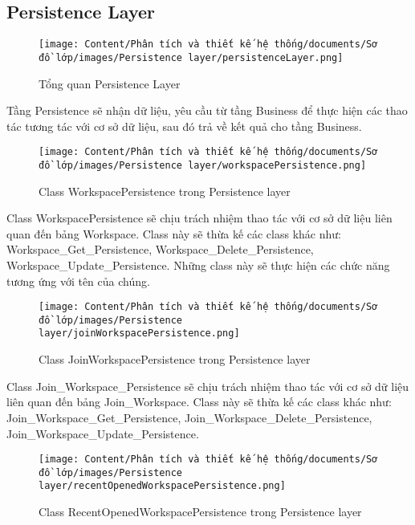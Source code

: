 \subsection{Persistence Layer}

\begin{figure}[H]
    \centering
    \texttt{[image: Content/Phân tích và thiết kế hệ thống/documents/Sơ đồ lớp/images/Persistence layer/persistenceLayer.png]}
    \vspace{0.5cm}
    \caption{Tổng quan Persistence Layer}
    \label{fig:Tổng quan Persistence Layer}
\end{figure}
Tầng Persistence sẽ nhận dữ liệu, yêu cầu từ tầng Business để thực hiện các thao tác tương tác với cơ sở dữ liệu, sau đó trả về kết quả cho tầng Business.

\begin{figure}[H]
    \centering
    \texttt{[image: Content/Phân tích và thiết kế hệ thống/documents/Sơ đồ lớp/images/Persistence layer/workspacePersistence.png]}
    \vspace{0.5cm}
    \caption{Class WorkspacePersistence trong Persistence layer}
    \label{fig:Class WorkspacePersistence trong Persistence layer}
\end{figure}
\par
Class WorkspacePersistence sẽ chịu trách nhiệm thao tác với cơ sở dữ liệu 
liên quan đến bảng Workspace. Class này sẽ thừa kế các class khác như:
Workspace\_Get\_Persistence, Workspace\_Delete\_Persistence, Workspace\_Update\_Persistence.
Những class này sẽ thực hiện các chức năng tương ứng với tên của chúng.
\begin{figure}[H]
    \centering
    \texttt{[image: Content/Phân tích và thiết kế hệ thống/documents/Sơ đồ lớp/images/Persistence layer/joinWorkspacePersistence.png]}
    \vspace{0.5cm}
    \caption{Class JoinWorkspacePersistence trong Persistence layer}
    \label{fig:Class JoinWorkspacePersistence trong Persistence layer}
\end{figure}
\par
Class Join\_Workspace\_Persistence sẽ chịu trách nhiệm thao tác với cơ sở dữ liệu
liên quan đến bảng Join\_Workspace. Class này sẽ thừa kế các class khác như:
Join\_Workspace\_Get\_Persistence, Join\_Workspace\_Delete\_Persistence, Join\_Workspace\_Update\_Persistence.
\begin{figure}[H]
    \centering
    \texttt{[image: Content/Phân tích và thiết kế hệ thống/documents/Sơ đồ lớp/images/Persistence layer/recentOpenedWorkspacePersistence.png]}
    \vspace{0.5cm}
    \caption{Class RecentOpenedWorkspacePersistence trong Persistence layer}
    \label{fig:Class RecentOpenedWorkspacePersistence trong Persistence layer}
\end{figure}
